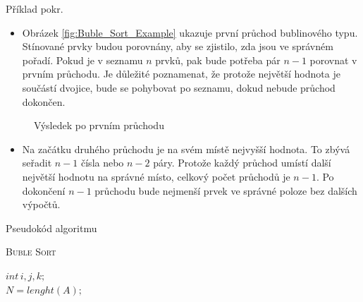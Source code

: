 \documentclass[11pt]{beamer}
\begin{document}
\begin{frame}{Příklad pokr.}
    
    \begin{itemize}
        \item Obrázek \ref{fig:Buble_Sort_Example} ukazuje první průchod bublinového typu. Stínované prvky budou porovnány, aby se zjistilo, zda jsou ve správném pořadí. Pokud je v seznamu \(n\) prvků, pak bude potřeba pár \(n-1\) porovnat v prvním průchodu. Je důležité poznamenat, že protože největší hodnota je součástí dvojice, bude se pohybovat po seznamu, dokud nebude průchod dokončen.
    \end{itemize}
    \begin{figure}
        \centering
        \caption{Výsledek po prvním průchodu}
        \label{fig:Buble_Sort_Example_2}
    \end{figure}
    \begin{itemize}
        \item Na začátku druhého průchodu je na svém místě nejvyšší hodnota. To zbývá seřadit \(n-1\) čísla nebo \(n-2\) páry. Protože každý průchod umístí další největší hodnotu na správné místo, celkový počet průchodů je \(n-1\). Po dokončení \(n-1\) průchodu bude nejmenší prvek ve správné poloze bez dalších výpočtů.
    \end{itemize}
   
\end{frame}

\begin{frame}{Pseudokód algoritmu}
    \begin{algorithm}[H]
        \label{algorithm:Buble_Sort}
        \caption{\textsc{Buble Sort}}
        $int\,i, j, k;$ \\
        $N = lenght(A);$ \\
         {
        }
    \end{algorithm}
\end{frame} 
\end{document}
